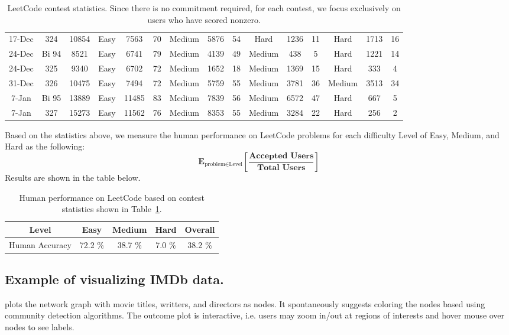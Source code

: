 \begin{table}[h]
\begin{tabular}{ccc|ccc|ccc|ccc|ccc}
17-Dec &  324 & 10854  & Easy & 7563 & 70 & Medium & 5876 & 54 & Hard & 1236 & 11 & Hard & 1713 & 16 \\
24-Dec & Bi 94 & 8521  & Easy & 6741 & 79 & Medium & 4139 & 49 & Medium & 438 & 5 & Hard & 1221 & 14 \\
24-Dec &  325 & 9340  & Easy & 6702 & 72 & Medium & 1652 & 18 & Medium & 1369 & 15 & Hard & 333 & 4 \\
31-Dec &  326 & 10475  & Easy & 7494 & 72 & Medium & 5759 & 55 & Medium & 3781 & 36 & Medium & 3513 & 34 \\
7-Jan & Bi 95 & 13889  & Easy & 11485 & 83 & Medium & 7839 & 56 & Medium & 6572 & 47 & Hard & 667 & 5 \\
7-Jan &  327 & 15273  & Easy & 11562 & 76 & Medium & 8353 & 55 & Medium & 3284 & 22 & Hard & 256 & 2 \\
\hline
\end{tabular}
\caption{LeetCode contest statistics. Since there is no commitment required, for each contest, we focus exclusively on users who have scored nonzero.}
\label{tab:leetcode-contest}
\end{table}
Based on the statistics above, we measure the human performance on LeetCode problems for each difficulty Level of Easy, Medium, and Hard as the following: $$\mathbf{E}_{\text{problem}\in\text{Level}}\left[\frac{\textbf{Accepted Users}}{\textbf{Total Users}}\right]$$ 
 Results are shown in the table below.
\begin{table}[h]
\centering
\begin{tabular}{c|ccc|c}
\toprule
Level & Easy & Medium & Hard & Overall\\
\midrule
\midrule
Human Accuracy & 72.2 \% & 38.7 \%  & 7.0 \% & 38.2 \% \\
\bottomrule
\end{tabular}
\caption{Human performance on LeetCode based on contest statistics shown in Table~\ref{tab:leetcode-contest}.}
\label{tab:humane-leetcode}
\end{table}

\newpage

\subsection{Example of \DV visualizing IMDb data.}
\label{sec:imdb}
\DV plots the network graph with movie titles, writters, and directors as nodes. It spontaneously suggests coloring the nodes based using community detection algorithms. The outcome plot is interactive, i.e. users may zoom in/out at regions of interests and hover mouse over nodes to see labels.

